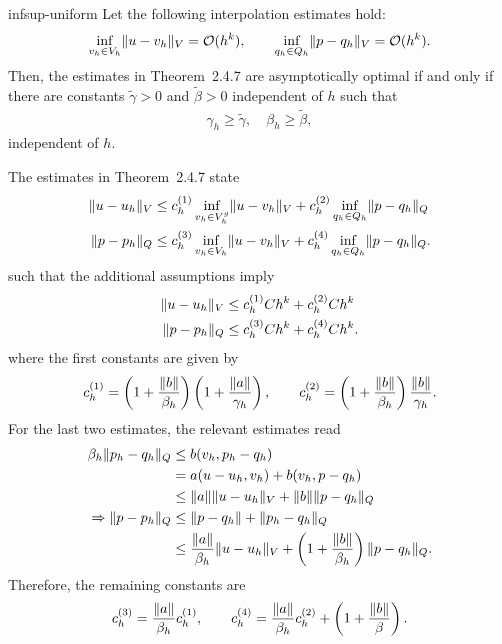 \begin{Problem}{infsup-uniform}
  Let the following interpolation estimates hold:
  \begin{gather*}
    \inf_{v_h\in V_h}\lVert u-v_h\rVert_V = \mathcal O(h^k),
    \qquad
    \inf_{q_h\in Q_h}\lVert p-q_h\rVert_V = \mathcal O(h^k).
  \end{gather*}
  Then, the estimates in %
  Theorem~2.4.7 are asymptotically optimal if and only if there are
  constants $\tilde \gamma>0$ and $\tilde \beta>0$ independent of
  $h$ such that
  \begin{gather}
    \label{eq:galerkin:14}
    \gamma_h\ge \tilde\gamma,\quad\beta_h\ge\tilde\beta,
  \end{gather}
  independent of $h$.
\begin{solution}
  The estimates in Theorem~2.4.7 state
  \begin{align*}
    \lVert u-u_h\rVert_V &\le c_h^{(1)} \inf_{v_h\in V_h^g}\lVert u-v_h\rVert_V
	      + c_h^{(2)} \inf_{q_h\in Q_h}\lVert p-q_h\rVert_Q \\
    \lVert p-p_h\rVert_Q &\le c_h^{(3)} \inf_{v_h\in V_h}\lVert u-v_h\rVert_V
	      + c_h^{(4)} \inf_{q_h\in Q_h}\lVert p-q_h\rVert_Q.
  \end{align*}
  such that the additional assumptions imply
  \begin{align*}
    \lVert u-u_h\rVert_V &\le c_h^{(1)} C h^k + c_h^{(2)} C h^k \\
    \lVert p-p_h\rVert_Q &\le c_h^{(3)} C h^k + c_h^{(4)} C h^k.
  \end{align*}
    where the first constants are given by
  \begin{align*}
    c_h^{(1)} = \left(1+\frac{\lVert b\rVert}{\beta_h}\right)
    \left(1+\frac{\lVert a\rVert}{\gamma_h}\right),
    \qquad
    c_h^{(2)} = \left(1+\frac{\lVert b\rVert}{\beta_h}\right)
    \frac{\lVert b\rVert}{\gamma_h}.
  \end{align*}
  For the last two estimates, the relevant estimates read
  \begin{align*}
    \beta_h \lVert p_h-q_h\rVert_Q
    &\le b(v_h,p_h-q_h)\\
    & = a(u-u_h, v_h) + b(v_h, p-q_h)\\
    &\le \lVert a\rVert \lVert u-u_h\rVert_V + \lVert b\rVert \lVert p-q_h\rVert_Q\\
    \Rightarrow \lVert p-p_h\rVert_Q
    &\le \lVert p-q_h\rVert + \lVert p_h-q_h\rVert_Q \\
    &\le \frac{\lVert a\rVert}{\beta_h} \lVert u-u_h\rVert_V + \left(1+\frac{\lVert b\rVert}{\beta_h}\right) \lVert p-q_h\rVert_Q.
  \end{align*}
  Therefore, the remaining constants are
  \begin{align*}
    c_h^{(3)} = \frac{\lVert a\rVert}{\beta_h}c_h^{(1)}, \qquad
    c_h^{(4)} = \frac{\lVert a\rVert}{\beta_h}c_h^{(2)}+\left(1+\frac{\lVert b\rVert}{\beta}\right).
  \end{align*}
\end{solution}
\end{Problem}

